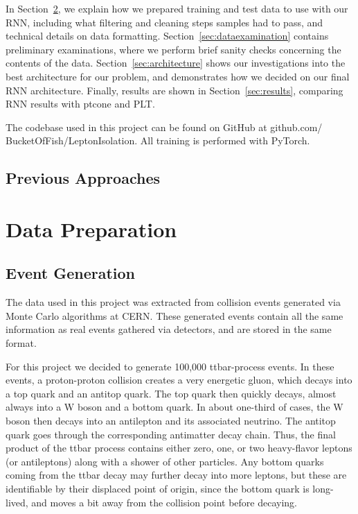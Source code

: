 
In Section~\ref{sec:dataprep}, we explain how we prepared training and test data to use with our RNN, including what filtering and cleaning steps samples had to pass, and technical details on data formatting. Section~\ref{sec:dataexamination} contains preliminary examinations, where we perform brief sanity checks concerning the contents of the data. Section~\ref{sec:architecture} shows our investigations into the best architecture for our problem, and demonstrates how we decided on our final RNN architecture. Finally, results are shown in Section~\ref{sec:results}, comparing RNN results with ptcone and PLT.

The codebase used in this project can be found on GitHub at github.com/ BucketOfFish/LeptonIsolation. All training is performed with PyTorch.

\section{Previous Approaches}

\chapter{Data Preparation}\label{sec:dataprep}

\section{Event Generation}

The data used in this project was extracted from collision events generated via Monte Carlo algorithms at CERN. These generated events contain all the same information as real events gathered via detectors, and are stored in the same format.


For this project we decided to generate 100,000 ttbar-process events. In these events, a proton-proton collision creates a very energetic gluon, which decays into a top quark and an antitop quark. The top quark then quickly decays, almost always into a W boson and a bottom quark. In about one-third of cases, the W boson then decays into an antilepton and its associated neutrino. The antitop quark goes through the corresponding antimatter decay chain. Thus, the final product of the ttbar process contains either zero, one, or two heavy-flavor leptons (or antileptons) along with a shower of other particles. Any bottom quarks coming from the ttbar decay may further decay into more leptons, but these are identifiable by their displaced point of origin, since the bottom quark is long-lived, and moves a bit away from the collision point before decaying.


